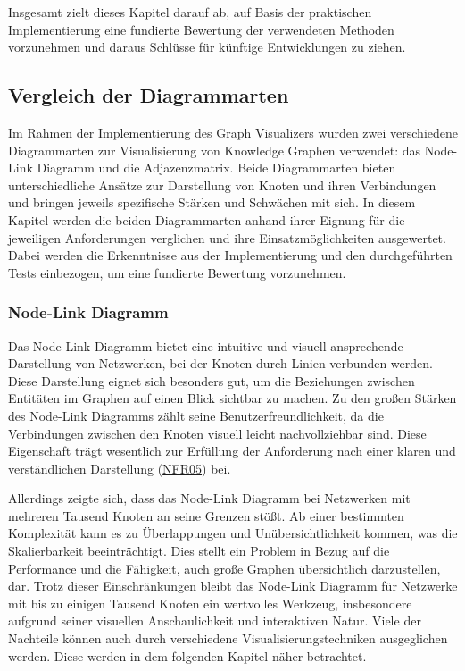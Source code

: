 Insgesamt zielt dieses Kapitel darauf ab, auf Basis der praktischen Implementierung eine fundierte Bewertung der verwendeten Methoden vorzunehmen und daraus Schlüsse für künftige Entwicklungen zu ziehen.

\subsection{Vergleich der Diagrammarten}

Im Rahmen der Implementierung des Graph Visualizers wurden zwei verschiedene Diagrammarten zur Visualisierung von Knowledge Graphen verwendet: das Node-Link Diagramm und die Adjazenzmatrix. Beide Diagrammarten bieten unterschiedliche Ansätze zur Darstellung von Knoten und ihren Verbindungen und bringen jeweils spezifische Stärken und Schwächen mit sich. In diesem Kapitel werden die beiden Diagrammarten anhand ihrer Eignung für die jeweiligen Anforderungen verglichen und ihre Einsatzmöglichkeiten ausgewertet. Dabei werden die Erkenntnisse aus der Implementierung und den durchgeführten Tests einbezogen, um eine fundierte Bewertung vorzunehmen.

\subsubsection{Node-Link Diagramm}

Das Node-Link Diagramm bietet eine intuitive und visuell ansprechende Darstellung von Netzwerken, bei der Knoten durch Linien verbunden werden. Diese Darstellung eignet sich besonders gut, um die Beziehungen zwischen Entitäten im Graphen auf einen Blick sichtbar zu machen. Zu den großen Stärken des Node-Link Diagramms zählt seine Benutzerfreundlichkeit, da die Verbindungen zwischen den Knoten visuell leicht nachvollziehbar sind. Diese Eigenschaft trägt wesentlich zur Erfüllung der Anforderung nach einer klaren und verständlichen Darstellung (\hyperref[NFR05]{NFR05}) bei.

Allerdings zeigte sich, dass das Node-Link Diagramm bei Netzwerken mit mehreren Tausend Knoten an seine Grenzen stößt. Ab einer bestimmten Komplexität kann es zu Überlappungen und Unübersichtlichkeit kommen, was die Skalierbarkeit beeinträchtigt. Dies stellt ein Problem in Bezug auf die Performance und die Fähigkeit, auch große Graphen übersichtlich darzustellen, dar. Trotz dieser Einschränkungen bleibt das Node-Link Diagramm für Netzwerke mit bis zu einigen Tausend Knoten ein wertvolles Werkzeug, insbesondere aufgrund seiner visuellen Anschaulichkeit und interaktiven Natur. Viele der Nachteile können auch durch verschiedene Visualisierungstechniken ausgeglichen werden. Diese werden in dem folgenden Kapitel näher betrachtet.

